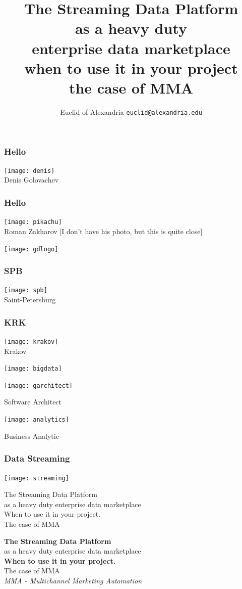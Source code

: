 \documentclass[aspectratio=169, 15pt,usenames,dvipsnames]{beamer}
\title{The Streaming Data Platform\\\small as a heavy duty\\enterprise data marketplace\\\tiny when to use it in your project\\the case of MMA}
\author[Euclid]{Euclid of Alexandria \texttt{euclid@alexandria.edu}}
\begin{document}
  
\begin{titlePage} 
	\titlepage        
\end{titlePage}
	
\begin{gdsw}
	\frametitle{Hello}
	\centering\texttt{[image: denis]}
	\\Denis Golovachev		
\end{gdsw} 
\begin{gdsw}
	\frametitle{Hello}
	\centering\texttt{[image: pikachu]}
	\\Roman Zakharov [I don't have his photo, but this is quite close]
\end{gdsw} 	
\begin{gdsw}
	\centering\texttt{[image: gdlogo]}
\end{gdsw}
\begin{gdsw}
	\frametitle{SPB}
	\centering\texttt{[image: spb]}
	\\Saint-Petersburg
\end{gdsw}
\begin{gdsw}
	\frametitle{KRK}
	\centering\texttt{[image: krakov]}
	\\Krakov
\end{gdsw}
\begin{gdsw}
	\centering\texttt{[image: bigdata]} 
\end{gdsw}
\begin{gdsw}
	\centering\texttt{[image: garchitect]} 
	\par\LARGE
	Software Architect
\end{gdsw}
\begin{gdsw}
	\centering\texttt{[image: analytics]} 
	\par\LARGE
	Business Analytic
\end{gdsw}
\begin{gdsw}
	\frametitle{Data Streaming}
	\centering\texttt{[image: streaming]} 
\end{gdsw}
\begin{gdsw}
	\centering\LARGE
	The Streaming Data Platform\\
	as a heavy duty enterprise data marketplace\\
	When to use it in your project.\\
	The case of MMA
\end{gdsw}
\begin{gdsw}
	\centering\LARGE
	{\bf The Streaming Data Platform}\\
	as a heavy duty enterprise data marketplace\\
	{\bf When to use it in your project.}\\
	The case of MMA
	\pause\\
	{\it\small MMA - Multichannel Marketing Automation}
\end{gdsw}
\end{document}
